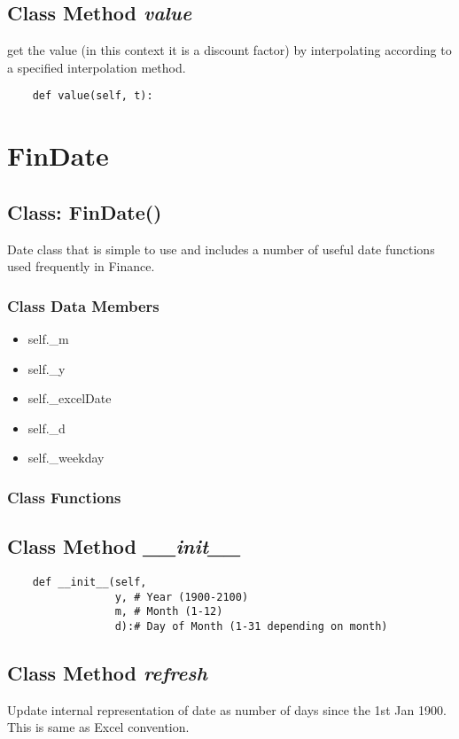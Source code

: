 \documentclass[twoside,11pt]{book}
\begin{document}
\subsection{Class Method {\it value}}
get the value (in this context it is a discount factor) by interpolating according to a specified interpolation method. 

\begin{lstlisting}
    def value(self, t):
\end{lstlisting}

\newpage
\section{FinDate}

\subsection{Class: FinDate()}
Date class that is simple to use and includes a number of useful date functions used frequently in Finance. 

\subsubsection{Class Data Members}
\begin{itemize}
\item{self.\_m}
\item{self.\_y}
\item{self.\_excelDate}
\item{self.\_d}
\item{self.\_weekday}
\end{itemize}

\subsubsection{Class Functions}

\subsection{Class Method {\it \_\_init\_\_}}


\begin{lstlisting}
    def __init__(self, 
                 y, # Year (1900-2100)
                 m, # Month (1-12)
                 d):# Day of Month (1-31 depending on month)
\end{lstlisting}

\subsection{Class Method {\it refresh}}
Update internal representation of date as number of days since the 1st Jan 1900. This is same as Excel convention. 
\end{document}
